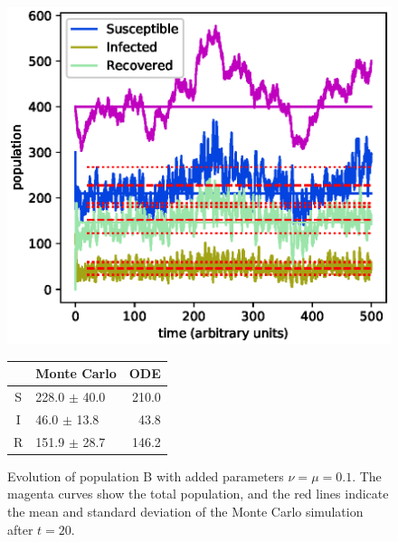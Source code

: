 \documentclass[a4paper,10pt,twocolumn]{article}
\begin{document}
\begin{figure}
	\centering
	\includegraphics[width=\linewidth]{Bd01e01_1.eps}
	\small
	\begin{tabular}{c l r}
  &    Monte Carlo     &  ODE  \\\hline
S &  228.0 $\pm$  40.0 &  210.0 \\
I &   46.0 $\pm$  13.8 &   43.8 \\
R &  151.9 $\pm$  28.7 &  146.2 \\\hline
	\end{tabular}
	\caption{Evolution of population B with added parameters $\nu=\mu=0.1$. The magenta curves show the total population, and the red lines indicate the mean and standard deviation of the Monte Carlo simulation after $t=20$.} 
	\label{fig:vit}
\end{figure}
\end{document}
